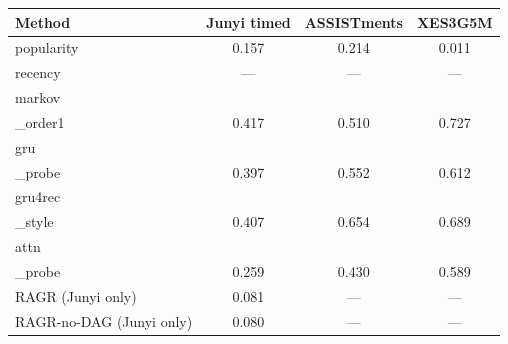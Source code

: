 \begin{tabular}{lccc}
\toprule
Method & Junyi timed & ASSISTments & XES3G5M \\
\midrule
popularity & 0.157 & 0.214 & 0.011 \\
recency & — & — & — \\
markov\\_order1 & 0.417 & 0.510 & 0.727 \\
gru\\_probe & 0.397 & 0.552 & 0.612 \\
gru4rec\\_style & 0.407 & 0.654 & 0.689 \\
attn\\_probe & 0.259 & 0.430 & 0.589 \\
RAGR (Junyi only) & 0.081 & — & — \\
RAGR-no-DAG (Junyi only) & 0.080 & — & — \\
\bottomrule
\end{tabular}
